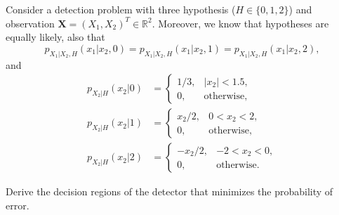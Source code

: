 \question



Consider a detection problem with three hypothesis ($H \in\{0,1,2\}$) and observation $\mathbf{X} = (X_1, X_2)^T \in \mathbb{R}^2$. Moreover, we know that hypotheses are equally likely, also that
\begin{equation*}
  p_{X_1|X_2,H}(x_1|x_2,0) = p_{X_1|X_2,H}(x_1|x_2,1) = p_{X_1|X_2,H}(x_1|x_2,2),
\end{equation*}
and
\begin{align*}
  p_{X_2|H}(x_2|0) &= \begin{cases} 1/3, & |x_2| < 1.5, \\ 0, & \text{otherwise}, \end{cases} \\
  p_{X_2|H}(x_2|1) &= \begin{cases} x_2/2, & 0 < x_2 < 2, \\ 0, & \text{otherwise}, \end{cases}\\
  p_{X_2|H}(x_2|2) &= \begin{cases} -x_2/2, & -2 < x_2 < 0, \\ 0, & \text{otherwise}. \end{cases}
\end{align*}

Derive the decision regions of the detector that minimizes the probability of error.

